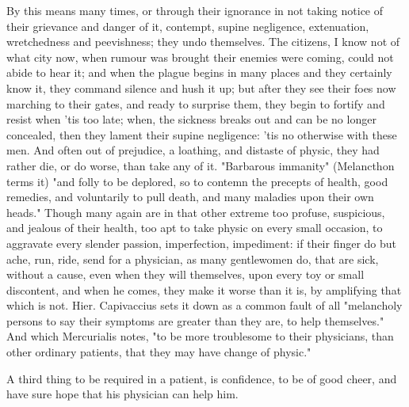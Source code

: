 {By this means many times, or through their ignorance in not taking notice of their grievance and danger of it, contempt, supine negligence, extenuation, wretchedness and peevishness; they undo themselves. The citizens, I know not of what city now, when rumour was brought their enemies were coming, could not abide to hear it; and when the plague begins in many places and they certainly know it, they command silence and hush it up; but after they see their foes now marching to their gates, and ready to surprise them, they begin to fortify and resist when 'tis too late; when, the sickness breaks out and can be no longer concealed, then they lament their supine negligence: 'tis no otherwise with these men. And often out of prejudice, a loathing, and distaste of physic, they had rather die, or do worse, than take any of it. "Barbarous immanity" (Melancthon terms it) "and folly to be deplored, so to contemn the precepts of health, good remedies, and voluntarily to pull death, and many maladies upon their own heads." Though many again are in that other extreme too profuse, suspicious, and jealous of their health, too apt to take physic on every small occasion, to aggravate every slender passion, imperfection, impediment: if their finger do but ache, run, ride, send for a physician, as many gentlewomen do, that are sick, without a cause, even when they will themselves, upon every toy or small discontent, and when he comes, they make it worse than it is, by amplifying that which is not. Hier. Capivaccius sets it down as a common fault of all "melancholy persons to say their symptoms are greater than they are, to help themselves." And which Mercurialis notes,  "to be more troublesome to their physicians, than other ordinary patients, that they may have change of physic."

A third thing to be required in a patient, is confidence, to be of good
cheer, and have sure hope that his physician can help him.

}
